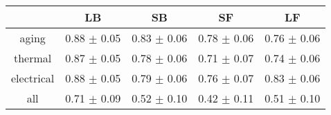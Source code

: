 \begin{tabular}{c c c c c }
\hline
 & LB & SB & SF & LF \\
\hline
aging & 0.88 $\pm$ 0.05 & 0.83 $\pm$ 0.06 & 0.78 $\pm$ 0.06 & 0.76 $\pm$ 0.06 \\
thermal & 0.87 $\pm$ 0.05 & 0.78 $\pm$ 0.06 & 0.71 $\pm$ 0.07 & 0.74 $\pm$ 0.06 \\
electrical & 0.88 $\pm$ 0.05 & 0.79 $\pm$ 0.06 & 0.76 $\pm$ 0.07 & 0.83 $\pm$ 0.06 \\
all & 0.71 $\pm$ 0.09 & 0.52 $\pm$ 0.10 & 0.42 $\pm$ 0.11 & 0.51 $\pm$ 0.10 \\
\hline
\end{tabular}